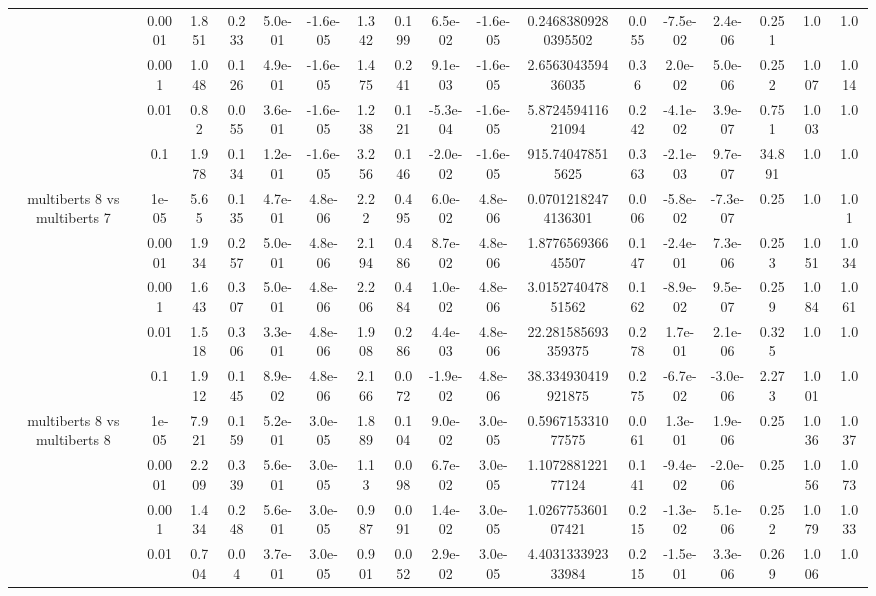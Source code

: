 \begin{tabular}{|c|c|c|c|c|c|c|c|c|c|c|c|c|c|c|c|c|}
 & 0.0001 & 1.851 & 0.233 & 5.0e-01 & -1.6e-05 & 1.342 & 0.199 & 6.5e-02 & -1.6e-05 & 0.24683809280395502 & 0.055 & -7.5e-02 & 2.4e-06 & 0.251 & 1.0 & 1.0 \\
 & 0.001 & 1.048 & 0.126 & 4.9e-01 & -1.6e-05 & 1.475 & 0.241 & 9.1e-03 & -1.6e-05 & 2.656304359436035 & 0.36 & 2.0e-02 & 5.0e-06 & 0.252 & 1.007 & 1.014 \\
 & 0.01 & 0.82 & 0.055 & 3.6e-01 & -1.6e-05 & 1.238 & 0.121 & -5.3e-04 & -1.6e-05 & 5.872459411621094 & 0.242 & -4.1e-02 & 3.9e-07 & 0.751 & 1.003 & 1.0 \\
 & 0.1 & 1.978 & 0.134 & 1.2e-01 & -1.6e-05 & 3.256 & 0.146 & -2.0e-02 & -1.6e-05 & 915.740478515625 & 0.363 & -2.1e-03 & 9.7e-07 & 34.891 & 1.0 & 1.0 \\
\hline
\multirow{5}{*}{multiberts 8 vs multiberts 7} & 1e-05 & 5.65 & 0.135 & 4.7e-01 & 4.8e-06 & 2.22 & 0.495 & 6.0e-02 & 4.8e-06 & 0.07012182474136301 & 0.006 & -5.8e-02 & -7.3e-07 & 0.25 & 1.0 & 1.01 \\
 & 0.0001 & 1.934 & 0.257 & 5.0e-01 & 4.8e-06 & 2.194 & 0.486 & 8.7e-02 & 4.8e-06 & 1.877656936645507 & 0.147 & -2.4e-01 & 7.3e-06 & 0.253 & 1.051 & 1.034 \\
 & 0.001 & 1.643 & 0.307 & 5.0e-01 & 4.8e-06 & 2.206 & 0.484 & 1.0e-02 & 4.8e-06 & 3.015274047851562 & 0.162 & -8.9e-02 & 9.5e-07 & 0.259 & 1.084 & 1.061 \\
 & 0.01 & 1.518 & 0.306 & 3.3e-01 & 4.8e-06 & 1.908 & 0.286 & 4.4e-03 & 4.8e-06 & 22.281585693359375 & 0.278 & 1.7e-01 & 2.1e-06 & 0.325 & 1.0 & 1.0 \\
 & 0.1 & 1.912 & 0.145 & 8.9e-02 & 4.8e-06 & 2.166 & 0.072 & -1.9e-02 & 4.8e-06 & 38.334930419921875 & 0.275 & -6.7e-02 & -3.0e-06 & 2.273 & 1.001 & 1.0 \\
\hline
\multirow{5}{*}{multiberts 8 vs multiberts 8} & 1e-05 & 7.921 & 0.159 & 5.2e-01 & 3.0e-05 & 1.889 & 0.104 & 9.0e-02 & 3.0e-05 & 0.596715331077575 & 0.061 & 1.3e-01 & 1.9e-06 & 0.25 & 1.036 & 1.037 \\
 & 0.0001 & 2.209 & 0.339 & 5.6e-01 & 3.0e-05 & 1.13 & 0.098 & 6.7e-02 & 3.0e-05 & 1.107288122177124 & 0.141 & -9.4e-02 & -2.0e-06 & 0.25 & 1.056 & 1.073 \\
 & 0.001 & 1.434 & 0.248 & 5.6e-01 & 3.0e-05 & 0.987 & 0.091 & 1.4e-02 & 3.0e-05 & 1.026775360107421 & 0.215 & -1.3e-02 & 5.1e-06 & 0.252 & 1.079 & 1.033 \\
 & 0.01 & 0.704 & 0.04 & 3.7e-01 & 3.0e-05 & 0.901 & 0.052 & 2.9e-02 & 3.0e-05 & 4.403133392333984 & 0.215 & -1.5e-01 & 3.3e-06 & 0.269 & 1.006 & 1.0 \\

\end{tabular}
